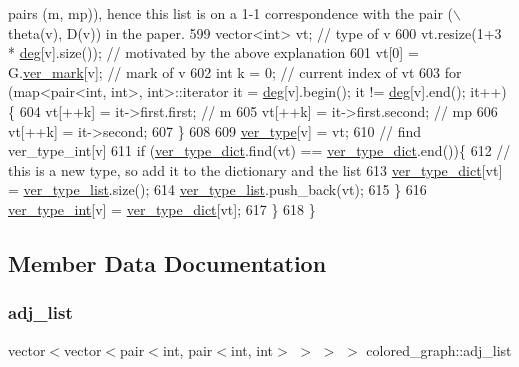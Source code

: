 \begin{DoxyCode}
{       pairs (m, mp)), hence this list is on a 1-1 correspondence with the pair (\(\backslash\)theta(v), D(v)) in the paper.}
599     vector<int> vt; \textcolor{comment}{// type of v}
600     vt.resize(1+3 * \hyperlink{classcolored__graph_ae3269d35c1b022bc70d195bebd4e1b8a}{deg}[v].size()); \textcolor{comment}{// motivated by the above explanation}
601     vt[0] = G.\hyperlink{classmarked__graph_ac83e9377dd4d8bb95be1ac949b127296}{ver\_mark}[v]; \textcolor{comment}{// mark of v}
602     \textcolor{keywordtype}{int} k = 0; \textcolor{comment}{// current index of vt}
603     \textcolor{keywordflow}{for} (map<pair<int, int>, \textcolor{keywordtype}{int}>::iterator it = \hyperlink{classcolored__graph_ae3269d35c1b022bc70d195bebd4e1b8a}{deg}[v].begin(); it != \hyperlink{classcolored__graph_ae3269d35c1b022bc70d195bebd4e1b8a}{deg}[v].end(); it++)\{
604       vt[++k] = it->first.first; \textcolor{comment}{// m}
605       vt[++k] = it->first.second; \textcolor{comment}{// mp}
606       vt[++k] = it->second;
607     \}
608 
609     \hyperlink{classcolored__graph_a2cc32e7146fa3319f83cfa940f5e1be4}{ver\_type}[v] = vt;
610     \textcolor{comment}{// find ver\_type\_int[v]}
611     \textcolor{keywordflow}{if} (\hyperlink{classcolored__graph_aeb780762429ddac375799f4a45405712}{ver\_type\_dict}.find(vt) == \hyperlink{classcolored__graph_aeb780762429ddac375799f4a45405712}{ver\_type\_dict}.end())\{
612       \textcolor{comment}{// this is a new type, so add it to the dictionary and the list }
613       \hyperlink{classcolored__graph_aeb780762429ddac375799f4a45405712}{ver\_type\_dict}[vt] = \hyperlink{classcolored__graph_a3a1ae8abac458d20a2afb4aa48bbc956}{ver\_type\_list}.size();
614       \hyperlink{classcolored__graph_a3a1ae8abac458d20a2afb4aa48bbc956}{ver\_type\_list}.push\_back(vt);
615     \}
616     \hyperlink{classcolored__graph_a491ed2ea1a65118af02ec606c8d44c0a}{ver\_type\_int}[v] = \hyperlink{classcolored__graph_aeb780762429ddac375799f4a45405712}{ver\_type\_dict}[vt];
617   \}
618 \}
\end{DoxyCode}


\subsection{Member Data Documentation}
\mbox{\label{classcolored__graph_a45dce16965079286cf3f41a54a1b2ea4}} 
\subsubsection{\texorpdfstring{adj\+\_\+list}{adj\_list}}
{\footnotesize\ttfamily vector$<$vector$<$pair$<$int, pair$<$int, int$>$ $>$ $>$ $>$ colored\+\_\+graph\+::adj\+\_\+list}



